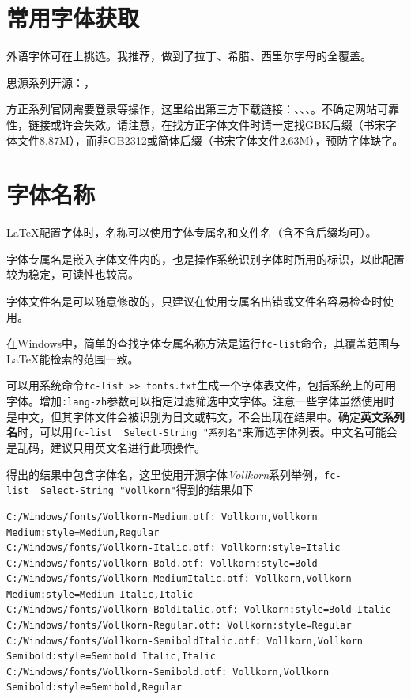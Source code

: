 \documentclass[10pt,openany]{book}
\begin{document}
\section{常用字体获取}

外语字体可在上挑选。我推荐，做到了拉丁、希腊、西里尔字母的全覆盖。

思源系列开源：，

方正系列官网需要登录等操作，这里给出第三方下载链接：、、、。不确定网站可靠性，链接或许会失效。请注意，在找方正字体文件时请一定找GBK后缀（书宋字体文件8.87M），而非GB2312或简体后缀（书宋字体文件2.63M），预防字体缺字。

\section{字体名称}

 {\LaTeX}配置字体时，名称可以使用字体专属名和文件名（含不含后缀均可）。

字体专属名是嵌入字体文件内的，也是操作系统识别字体时所用的标识，以此配置较为稳定，可读性也较高。

字体文件名是可以随意修改的，只建议在使用专属名出错或文件名容易检查时使用。

在Windows中，简单的查找字体专属名称方法是运行\texttt{fc-list}命令，其覆盖范围与{\LaTeX}能检索的范围一致。

可以用系统命令\texttt{fc-list\ \textgreater{}\textgreater{}\ fonts.txt}生成一个字体表文件，包括系统上的可用字体。增加\texttt{:lang-zh}参数可以指定过滤筛选中文字体。注意一些字体虽然使用时是中文，但其字体文件会被识别为日文或韩文，不会出现在结果中。确定\textbf{英文系列名}时，可以用\texttt{fc-list\ \textbar{}\ Select-String\ "系列名"}来筛选字体列表。中文名可能会是乱码，建议只用英文名进行此项操作。

得出的结果中包含字体名，这里使用开源字体\textit{Vollkorn}系列举例，\texttt{fc-list\ \textbar{}\ Select-String\ "Vollkorn"}得到的结果如下

\begin{lstlisting}[title=\textit{Vollkorn}查询结果]
C:/Windows/fonts/Vollkorn-Medium.otf: Vollkorn,Vollkorn Medium:style=Medium,Regular
C:/Windows/fonts/Vollkorn-Italic.otf: Vollkorn:style=Italic
C:/Windows/fonts/Vollkorn-Bold.otf: Vollkorn:style=Bold
C:/Windows/fonts/Vollkorn-MediumItalic.otf: Vollkorn,Vollkorn Medium:style=Medium Italic,Italic
C:/Windows/fonts/Vollkorn-BoldItalic.otf: Vollkorn:style=Bold Italic
C:/Windows/fonts/Vollkorn-Regular.otf: Vollkorn:style=Regular
C:/Windows/fonts/Vollkorn-SemiboldItalic.otf: Vollkorn,Vollkorn Semibold:style=Semibold Italic,Italic
C:/Windows/fonts/Vollkorn-Semibold.otf: Vollkorn,Vollkorn Semibold:style=Semibold,Regular
\end{lstlisting}
\end{document}
